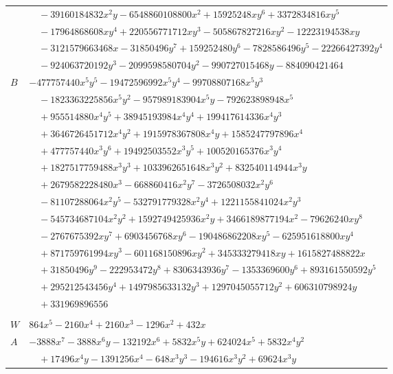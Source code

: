\documentclass[11pt]{article}
\begin{document}
\begin{longtable}{@{}ll@{}}
 & $\quad -39160184832x^{2}y-6548860108800x^{2}+15925248xy^{6}+3372834816xy^{5}$\\
 & $\quad -17964868608xy^{4}+220556771712xy^{3}-505867827216xy^{2}-12223194538xy$\\
 & $\quad -3121579663468x-31850496y^{7}+159252480y^{6}-7828586496y^{5}-22266427392y^{4}$\\
 & $\quad -924063720192y^{3}-2099598580704y^{2}-990727015468y-884090421464$\\
$B$ & $-477757440x^{5}y^{5}-19472596992x^{5}y^{4}-99708807168x^{5}y^{3}$\\
 & $\quad -1823363225856x^{5}y^{2}-957989183904x^{5}y-792623898948x^{5}$\\
 & $\quad +955514880x^{4}y^{5}+38945193984x^{4}y^{4}+199417614336x^{4}y^{3}$\\
 & $\quad +3646726451712x^{4}y^{2}+1915978367808x^{4}y+1585247797896x^{4}$\\
 & $\quad +477757440x^{3}y^{6}+19492503552x^{3}y^{5}+100520165376x^{3}y^{4}$\\
 & $\quad +1827517759488x^{3}y^{3}+1033962651648x^{3}y^{2}+832540114944x^{3}y$\\
 & $\quad +2679582228480x^{3}-668860416x^{2}y^{7}-3726508032x^{2}y^{6}$\\
 & $\quad -81107288064x^{2}y^{5}-532791779328x^{2}y^{4}+1221155841024x^{2}y^{3}$\\
 & $\quad -545734687104x^{2}y^{2}+1592749425936x^{2}y+3466189877194x^{2}-79626240xy^{8}$\\
 & $\quad -2767675392xy^{7}+6903456768xy^{6}-190486862208xy^{5}-625951618800xy^{4}$\\
 & $\quad +871759761994xy^{3}-601168150896xy^{2}+345333279418xy+1615827488822x$\\
 & $\quad +31850496y^{9}-222953472y^{8}+8306343936y^{7}-1353369600y^{6}+893161550592y^{5}$\\
 & $\quad +295212543456y^{4}+1497985633132y^{3}+1297045055712y^{2}+606310798924y$\\
 & $\quad +331969896556$\\
\addlinespace[3pt]
\multicolumn{2}{@{}l}{$i=71$, $m=27$, neighbours $7,27,59,62,63,75$}\\
$W$ & $864x^{5}-2160x^{4}+2160x^{3}-1296x^{2}+432x$\\
$A$ & $-3888x^{7}-3888x^{6}y-132192x^{6}+5832x^{5}y+624024x^{5}+5832x^{4}y^{2}$\\
 & $\quad +17496x^{4}y-1391256x^{4}-648x^{3}y^{3}-194616x^{3}y^{2}+69624x^{3}y$\\

\end{longtable}
\end{document}
